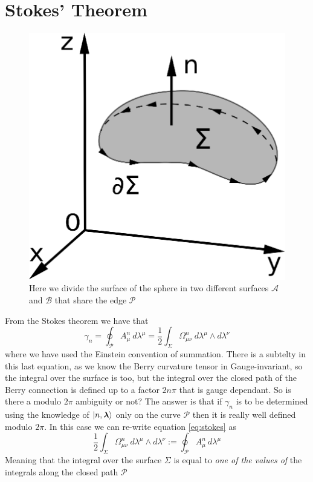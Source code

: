     \section{Stokes' Theorem}
    \begin{figure}
        \includegraphics[width=0.7\linewidth]{Immagini/stokes.eps}
        \caption{Here we divide the surface of the sphere in two different surfaces $\mathcal A$ and $\mathcal B$ that share the edge $\mathcal P$}
    \end{figure}
    From the Stokes theorem we have that
    \begin{equation}
        \label{eq:stokes}
            \gamma_n=\oint_\mathcal{P} A^n_\mu\: d\lambda^\mu=\frac 12 \int_\Sigma \Omega_{\mu\nu}^n\: d\lambda^\mu \wedge d\lambda^\nu
    \end{equation}
    where we have used the Einstein convention of summation.\newline
    There is a subtelty in this last equation, as we know the Berry curvature tensor in Gauge-invariant, so the integral over the surface is too, but the integral over the closed path of the Berry connection is defined up to a factor $2n\pi$ that is gauge dependant.
    So is there a modulo $2\pi$ ambiguity or not?\newline
    The answer is that if $\gamma_n$ is to be determined using the knowledge of $\ket{n,\boldsymbol \lambda}$ 
    only on the curve $\mathcal P$ then it is really well defined modulo $2\pi$. In this case we can re-write 
    equation \ref{eq:stokes} as 
    \[
    \frac 12 \int_\Sigma \Omega_{\mu\nu}^n\: d\lambda^\mu \wedge d\lambda^\nu:=\oint_\mathcal{P} A^n_\mu\: d\lambda^\mu
    \]
    Meaning that the integral over the surface $\Sigma$ is equal to \textit{one of the values of} the integrals along the closed path $\mathcal P$\newline

